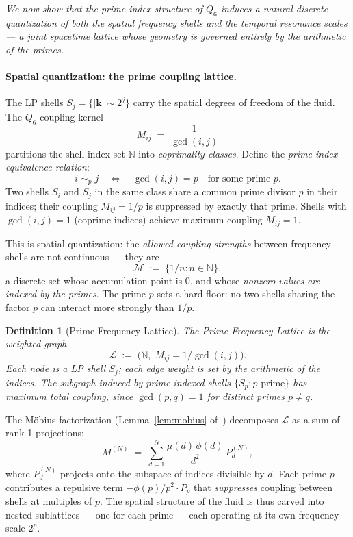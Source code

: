 \documentclass[11pt]{article}
\newtheorem{definition}[theorem]{Definition}
\begin{document}
\textit{We now show that the prime index structure of $Q_6$ induces a
natural discrete quantization of both the spatial frequency shells and the
temporal resonance scales --- a joint spacetime lattice whose geometry is
governed entirely by the arithmetic of the primes.}

\paragraph{Spatial quantization: the prime coupling lattice.}

The LP shells $S_j = \{|\mathbf{k}| \sim 2^j\}$ carry the spatial
degrees of freedom of the fluid.
The $Q_6$ coupling kernel
\[
  M_{ij} \;=\; \frac{1}{\gcd(i,j)}
\]
partitions the shell index set $\mathbb{N}$ into \emph{coprimality classes}.
Define the \emph{prime-index equivalence relation}:
\[
  i \;\sim_p\; j \quad\Longleftrightarrow\quad \gcd(i,j) = p
  \quad\text{for some prime }p.
\]
Two shells $S_i$ and $S_j$ in the same class share a common prime divisor
$p$ in their indices; their coupling $M_{ij} = 1/p$ is suppressed by exactly
that prime. Shells with $\gcd(i,j) = 1$ (coprime indices) achieve maximum
coupling $M_{ij} = 1$.

This is spatial quantization: the \emph{allowed coupling strengths} between
frequency shells are not continuous --- they are
\[
  \mathcal{M} \;:=\; \bigl\{1/n : n \in \mathbb{N}\bigr\},
\]
a discrete set whose accumulation point is $0$, and whose \emph{nonzero
values are indexed by the primes}. The prime $p$ sets a hard floor:
no two shells sharing the factor $p$ can interact more strongly than $1/p$.

\begin{definition}[Prime Frequency Lattice]
The \emph{Prime Frequency Lattice} is the weighted graph
\[
  \mathcal{L} \;:=\; \bigl(\mathbb{N},\; M_{ij} = 1/\gcd(i,j)\bigr).
\]
Each node is a LP shell $S_j$; each edge weight is set by the arithmetic
of the indices. The subgraph induced by prime-indexed shells
$\{S_p : p \text{ prime}\}$ has maximum total coupling, since
$\gcd(p,q) = 1$ for distinct primes $p \neq q$.
\end{definition}

The M\"obius factorization (Lemma~\ref{lem:mobius} of~\cite{SimonsQ6RH2026})
decomposes $\mathcal{L}$ as a sum of rank-1 projections:
\[
  M^{(N)} \;=\; \sum_{d=1}^{N} \frac{\mu(d)\,\phi(d)}{d^2}\,P_d^{(N)},
\]
where $P_d^{(N)}$ projects onto the subspace of indices divisible by $d$.
Each prime $p$ contributes a repulsive term $-\phi(p)/p^2 \cdot P_p$
that \emph{suppresses} coupling between shells at multiples of $p$.
The spatial structure of the fluid is thus carved into nested sublattices
--- one for each prime --- each operating at its own frequency scale $2^p$.
\end{document}
